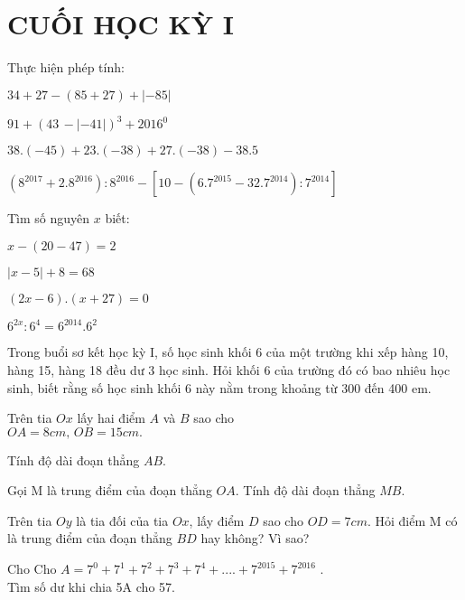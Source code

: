 \section{CUỐI HỌC KỲ I}
\setcounter{ex}{0}
\begin{ex}
	Thực hiện phép tính:
	\begin{listEX}
	\item $34+27-\left( 85+27 \right)+|-85|$ 
\item $91+{{\left( 43\,-|-41| \right)}^{3}}+{{2016}^{0}}$ 
\item $38.\left( -45 \right)+23.\left( -38 \right)+27.\left( -38 \right)-38.5$ 
\item $\left( {{8}^{2017}}+{{2.8}^{2016}} \right):{{8}^{2016}}-\left[ 10-\left( {{6.7}^{2015}}-{{32.7}^{2014}} \right):{{7}^{2014}} \right]$ 
	\end{listEX}
\end{ex}
\begin{ex}
	Tìm số nguyên $x$ biết:
	\begin{listEX}[2]
	\item $x-\left( 20-47 \right)=2$ 
\item $|x-5|+8=68$ 
\item $\left( 2x-6 \right).\left( x+27 \right)=0$ 
\item ${{6}^{2x}}:{{6}^{4}}={{6}^{2014}}{{.6}^{2}}$ 
	\end{listEX}
\end{ex}
\begin{ex}
	Trong buổi sơ kết học kỳ I, số học sinh khối 6 của một trường khi xếp hàng 10, hàng 15, hàng 18 đều dư 3 học sinh. Hỏi khối 6 của trường đó có bao nhiêu học sinh, biết rằng số học sinh khối 6 này nằm trong khoảng từ 300 đến 400 em.
\end{ex}
\begin{ex}
	Trên tia $Ox$ lấy hai điểm $A$ và $B$ sao cho\\ $OA=8cm,\,OB=15cm.$ 
		\begin{listEX}
			\item Tính độ dài đoạn thẳng $AB.$ 
	\item Gọi M là trung điểm của đoạn thẳng $OA$. Tính độ dài đoạn thẳng $MB.$ 
	\item Trên tia $Oy$ là tia đối của tia $Ox$, lấy điểm $D$ sao cho $OD=7cm.$ Hỏi điểm M có là trung điểm của đoạn thẳng $BD$ hay không? Vì sao?
		\end{listEX}
\end{ex}
\begin{ex}
	Cho  Cho $A={{7}^{0}}+{{7}^{1}}+{{7}^{2}}+{{7}^{3}}+{{7}^{4}}+....+{{7}^{2015}}+{{7}^{2016}}$ . \\Tìm số dư khi chia 5A cho 57.
\end{ex}